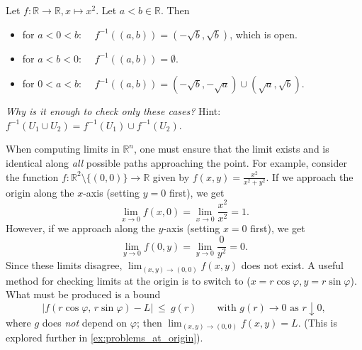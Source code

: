\begin{example}[$f(x) = x^2$]
Let $f : \mathbb{R} \to \mathbb{R}, x \mapsto x^2$. Let $a < b \in \mathbb{R}$. Then
\begin{itemize}
  \item for $a < 0 < b$: $\quad f^{-1}((a,b)) = (-\sqrt{b}, \sqrt{b})$, which is open.
  \item for $a < b < 0$: $\quad f^{-1}((a,b)) = \emptyset$.
  \item for $0 < a < b$: $\quad f^{-1}((a,b)) = (-\sqrt{b}, -\sqrt{a}) \cup (\sqrt{a}, \sqrt{b})$.
\end{itemize}
\textit{Why is it enough to check only these cases?} Hint:
$f^{-1}(U_1 \cup U_2) = f^{-1}(U_1) \cup f^{-1}(U_2)$.
\end{example}

\begin{example}
\label{ex:limits_in_r2}
When computing limits in $\mathbb{R}^n$, one must ensure that the limit exists and is identical along \emph{all} possible paths approaching the point. For example, consider the function $f: \mathbb{R}^2 \setminus \{(0,0)\} \to \mathbb{R}$ given by $f(x,y) = \frac{x^2}{x^2+y^2}$.
If we approach the origin along the $x$-axis (setting $y=0$ first), we get
\[
\lim_{x \to 0} f(x, 0) = \lim_{x \to 0} \frac{x^2}{x^2} = 1.
\]
However, if we approach along the $y$-axis (setting $x=0$ first), we get
\[
\lim_{y \to 0} f(0, y) = \lim_{y \to 0} \frac{0}{y^2} = 0.
\]
Since these limits disagree, $\lim_{(x,y) \to (0,0)} f(x,y)$ does not exist. A useful method for
checking limits at the origin is to switch to 
($x = r\cos\varphi, y = r\sin\varphi$). What must be produced is a bound
\[\big\lvert f(r\cos\varphi,\,r\sin\varphi) - L\big\rvert \ \leq\ g(r)
  \qquad\text{with } g(r) \to 0 \text{ as } r \downarrow 0,\]
where $g$ does \emph{not} depend on $\varphi$; then $\lim_{(x,y)\to(0,0)}f(x,y) = L$.
(This is explored further in \cref{ex:problems_at_origin}).
\end{example}

